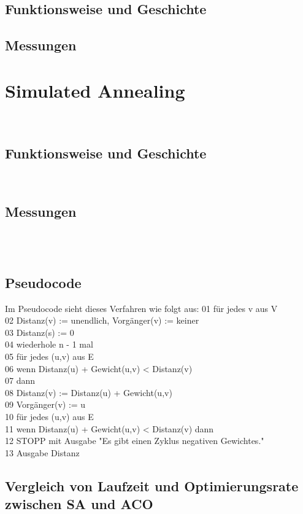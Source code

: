 \documentclass[a4paper]{article}
\begin{document}
		\subsection{Funktionsweise und Geschichte}
		
		
		
		\subsection{Messungen}
		

		
		\section{Simulated Annealing}
\\

		\subsection{Funktionsweise und Geschichte}

\\

		\subsection{Messungen}
		



\\
\\

		\subsection{Pseudocode}
		Im Pseudocode sieht dieses Verfahren wie folgt aus:
01  für jedes v aus V    \\               
02      Distanz(v) := unendlich, Vorgänger(v) := keiner\\
03  Distanz(s) := 0\\
04  wiederhole n - 1 mal               \\
05      für jedes (u,v) aus E\\
06          wenn Distanz(u) + Gewicht(u,v) < Distanz(v)\\
07          dann\\
08              Distanz(v) := Distanz(u) + Gewicht(u,v)\\
09              Vorgänger(v) := u\\
10  für jedes (u,v) aus E                \\
11      wenn Distanz(u) + Gewicht(u,v) < Distanz(v) dann\\
12          STOPP mit Ausgabe "Es gibt einen Zyklus negativen Gewichtes."\\

13  Ausgabe Distanz\\
\newpage

		\subsection{Vergleich von Laufzeit und Optimierungsrate zwischen SA und ACO}
		

	
\end{document}
